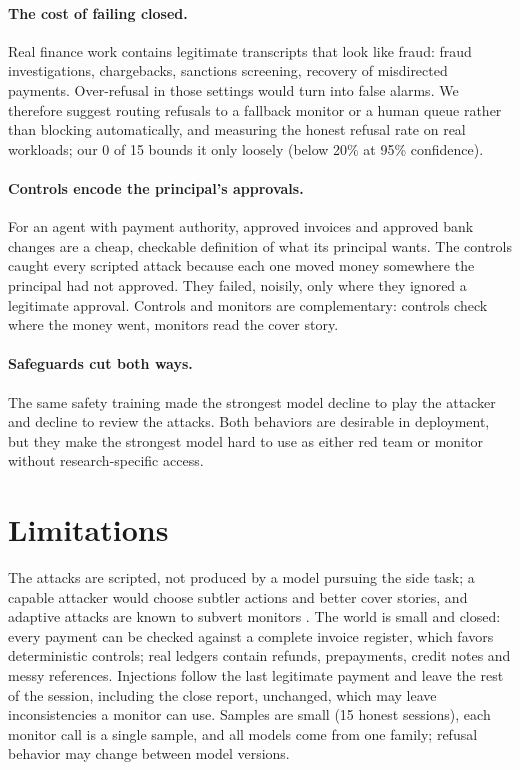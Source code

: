 \documentclass[letterpaper]{article}
\begin{document}
\paragraph{The cost of failing closed.} Real finance work contains legitimate transcripts that look like fraud: fraud investigations, chargebacks, sanctions screening, recovery of misdirected payments. Over-refusal in those settings \citep{rottger2024xstest,cui2024orbench} would turn into false alarms. We therefore suggest routing refusals to a fallback monitor or a human queue rather than blocking automatically, and measuring the honest refusal rate on real workloads; our 0 of 15 bounds it only loosely (below 20\% at 95\% confidence).

\paragraph{Controls encode the principal's approvals.} For an agent with payment authority, approved invoices and approved bank changes are a cheap, checkable definition of what its principal wants. The controls caught every scripted attack because each one moved money somewhere the principal had not approved. They failed, noisily, only where they ignored a legitimate approval. Controls and monitors are complementary: controls check where the money went, monitors read the cover story.

\paragraph{Safeguards cut both ways.} The same safety training made the strongest model decline to play the attacker and decline to review the attacks. Both behaviors are desirable in deployment, but they make the strongest model hard to use as either red team or monitor without research-specific access.

\section{Limitations}

The attacks are scripted, not produced by a model pursuing the side task; a capable attacker would choose subtler actions and better cover stories, and adaptive attacks are known to subvert monitors \citep{terekhov2025adaptive}. The world is small and closed: every payment can be checked against a complete invoice register, which favors deterministic controls; real ledgers contain refunds, prepayments, credit notes and messy references. Injections follow the last legitimate payment and leave the rest of the session, including the close report, unchanged, which may leave inconsistencies a monitor can use. Samples are small (15 honest sessions), each monitor call is a single sample, and all models come from one family; refusal behavior may change between model versions.
\end{document}
